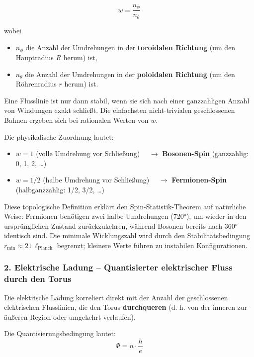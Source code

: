 	\begin{equation}
		w = \frac{n_\phi}{n_\theta}
		\label{eq:winding_number}
	\end{equation}
	
	wobei
	\begin{itemize}
		\item $n_\phi$ die Anzahl der Umdrehungen in der \textbf{toroidalen Richtung} (um den Hauptradius $R$ herum) ist,
		\item $n_\theta$ die Anzahl der Umdrehungen in der \textbf{poloidalen Richtung} (um den Röhrenradius $r$ herum) ist.
	\end{itemize}
	
	Eine Flusslinie ist nur dann stabil, wenn sie sich nach einer ganzzahligen Anzahl von Windungen exakt schließt. Die einfachsten nicht-trivialen geschlossenen Bahnen ergeben sich bei rationalen Werten von $w$.
	
	Die physikalische Zuordnung lautet:
	\begin{itemize}
		\item $w = 1$ \quad (volle Umdrehung vor Schließung) $\quad \to$ \textbf{Bosonen-Spin} (ganzzahlig: 0, 1, 2, …)
		\item $w = 1/2$ \quad (halbe Umdrehung vor Schließung) $\quad \to$ \textbf{Fermionen-Spin} (halbganzzahlig: 1/2, 3/2, …)
	\end{itemize}
	
	Diese topologische Definition erklärt den Spin-Statistik-Theorem auf natürliche Weise: Fermionen benötigen zwei halbe Umdrehungen (720°), um wieder in den ursprünglichen Zustand zurückzukehren, während Bosonen bereits nach 360° identisch sind. Die minimale Wicklungszahl wird durch den Stabilitätsbedingung $r_{\min} \approx 21 \, \ell_{\text{Planck}}$ begrenzt; kleinere Werte führen zu instabilen Konfigurationen.
	
	\subsubsection{2. Elektrische Ladung – Quantisierter elektrischer Fluss durch den Torus}
	
	Die elektrische Ladung korreliert direkt mit der Anzahl der geschlossenen elektrischen Flusslinien, die den Torus \textbf{durchqueren} (d. h. von der inneren zur äußeren Region oder umgekehrt verlaufen).
	
	Die Quantisierungsbedingung lautet:
	\begin{equation}
		\Phi = n \cdot \frac{h}{e}
		\label{eq:flux_quantization}
	\end{equation}
	
